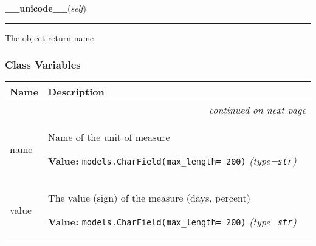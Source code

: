     \vspace{0.5ex}

\hspace{.8\funcindent}\begin{boxedminipage}{\funcwidth}

    \raggedright \textbf{\_\_unicode\_\_}(\textit{self})

    \vspace{-1.5ex}

    \rule{\textwidth}{0.5\fboxrule}
\setlength{\parskip}{2ex}
    The object return name

\setlength{\parskip}{1ex}
    \end{boxedminipage}



  \subsubsection{Class Variables}

    \vspace{-1cm}
\hspace{\varindent}\begin{longtable}{|p{\varnamewidth}|p{\vardescrwidth}|l}
\cline{1-2}
\cline{1-2} \centering \textbf{Name} & \centering \textbf{Description}& \\
\cline{1-2}
\endhead\cline{1-2}\multicolumn{3}{r}{\small\textit{continued on next page}}\\\endfoot\cline{1-2}
\endlastfoot\raggedright n\-a\-m\-e\- & \raggedright Name of the unit of measure

\textbf{Value:} 
{\tt models.CharField(max\_length= 200)}            {\it (type=\texttt{str})}&\\
\cline{1-2}
\raggedright v\-a\-l\-u\-e\- & \raggedright The value (sign) of the measure (days, percent)

\textbf{Value:} 
{\tt models.CharField(max\_length= 200)}            {\it (type=\texttt{str})}&\\
\cline{1-2}
\end{longtable}



